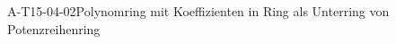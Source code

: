 
\begin{DEF}{A-T15-04-02}{Polynomring mit Koeffizienten in Ring als Unterring von Potenzreihenring}
\end{DEF}
